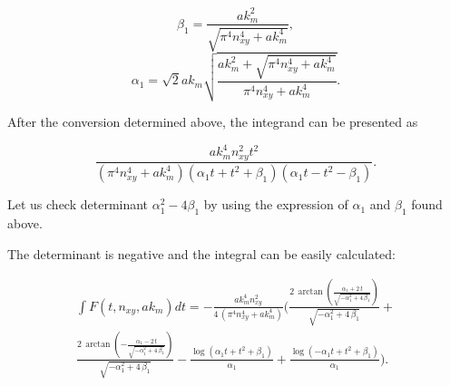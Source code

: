 \documentclass[twoside, 10pt, ptm]{article}
\begin{document}
\begin{multicols}{2}
\begin{equation}\beta_{1} = \frac{\mathit{ak}_{m}^{2}}{\sqrt{\pi^{4} n_{\mathit{xy}}^{4} + \mathit{ak}_{m}^{4}}},\end{equation} \begin{equation}\alpha_{1} = \sqrt{2} \mathit{ak}_{m} \sqrt{\frac{\mathit{ak}_{m}^{2} + \sqrt{\pi^{4} n_{\mathit{xy}}^{4} + \mathit{ak}_{m}^{4}}}{\pi^{4} n_{\mathit{xy}}^{4} + \mathit{ak}_{m}^{4}}}.\end{equation}

    After the conversion determined above, the integrand can be presented as

    \[\frac{\mathit{ak}_{m}^{4} n_{\mathit{xy}}^{2} t^{2}}{{\left(\pi^{4} n_{\mathit{xy}}^{4} + \mathit{ak}_{m}^{4}\right)} {\left(\alpha_{1} t + t^{2} + \beta_{1}\right)} {\left(\alpha_{1} t - t^{2} - \beta_{1}\right)}}.\]

    Let us check determinant \(\alpha_1^2 - 4\beta_1\) by using the
expression of \(\alpha_1\) and \(\beta_1\) found above.

    The determinant is negative and the integral can be easily calculated:

\noindent
    \[\begin{array}{r} \int F\left(t, n_{xy}, ak_m\right) dt = -\frac{\mathit{ak}_{m}^{4} n_{\mathit{xy}}^{2}}{4 \, {\left(\pi^{4} n_{\mathit{xy}}^{4} + \mathit{ak}_{m}^{4}\right)}} \Bigg(\frac{2 \, \arctan\left(\frac{\alpha_{1} + 2 \, t}{\sqrt{-\alpha_{1}^{2} + 4 \, \beta_{1}}}\right)}{\sqrt{-\alpha_{1}^{2} + 4 \, \beta_{1}}} + \\ \frac{2 \, \arctan\left(-\frac{\alpha_{1} - 2 \, t}{\sqrt{-\alpha_{1}^{2} + 4 \, \beta_{1}}}\right)}{\sqrt{-\alpha_{1}^{2} + 4 \, \beta_{1}}} - \frac{\log\left(\alpha_{1} t + t^{2} + \beta_{1}\right)}{\alpha_{1}} + \frac{\log\left(-\alpha_{1} t + t^{2} + \beta_{1}\right)}{\alpha_{1}}\Bigg). \end{array}\]




\end{multicols}
\end{document}
